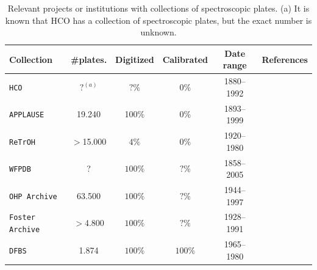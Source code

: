 \begin{table}
    \caption{
        Relevant projects or institutions with collections of spectroscopic plates.
(a) It is known that HCO has a collection of spectroscopic plates, but the exact number is unknown.
        }\label{tab:collections}
    \begin{tabularx}{\linewidth}{ p{2.5cm} C C C C C }
        \hline
        \centering Collection & \#plates. & Digitized & Calibrated & Date range & References\\
        \hline
        \texttt{HCO} & $?^{(a)}$ & $?\%$ & $0\%$ & 1880--1992 &\cite{placas_DASCH}\\
        \hline
        \texttt{APPLAUSE} & 19.240 & 100$\%$ & 0\% & 1893--1999 &\cite{placas_APPLAUSE}\\
        \hline
        \texttt{ReTrOH} & $>$15.000 & $4\%$ & $0\%$ & 1920--1980 &\cite{peralta2025puesta} \\
        \hline
        \texttt{WFPDB} & ? & $100\%$ & $?\%$ & 1858--2005 &\cite{placas_WFPDB,placas_WFPDB_2} \\ %
        \hline
        \texttt{OHP Archive} & 63.500 & $100\%$ & $?\%$ & 1944--1997 &\cite{robert2021naroo} \\
        \hline
        \texttt{Foster Archive} & $>$4.800 & $100\%$ & $?\%$ & 1928--1991 &\cite{archive_foster} \\
        \hline
        \texttt{DFBS} & 1.874 & $100\%$ & $100\%$ & 1965--1980 &\cite{placa_DFBS} \\
        \hline
    \end{tabularx}
\end{table}

